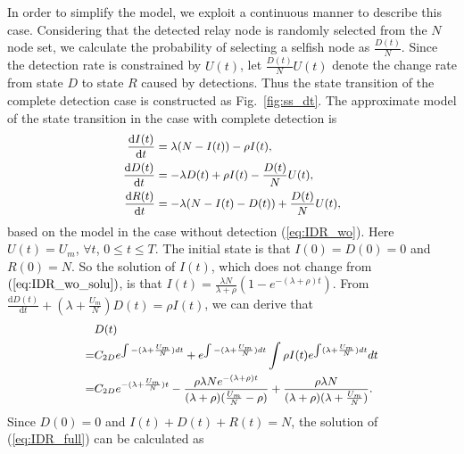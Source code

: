 In order to simplify the model,
we exploit a continuous manner to
describe this case.
Considering that the detected relay node
is randomly selected from the $N$ node set,
we calculate the probability of selecting a selfish node
as $\frac{D(t)}{N}$.
Since the detection rate is constrained by $U(t)$,
let $\frac{D(t)}{N}U(t)$ denote
the change rate from state $D$ to state $R$ caused by detections.
Thus the state transition of the complete detection case
is constructed as Fig.~\ref{fig:ss_dt}.
The approximate model of the state transition
in the case with complete detection
is
\begin{equation}
\begin{small}
\label{eq:IDR_full}
\begin{aligned}
\frac{\mathrm{d} I(t)}{\mathrm{d} t} &=  \lambda (N-I(t)) - \rho I(t),\\
\frac{\mathrm{d} D(t)}{\mathrm{d} t} &= - \lambda D(t) + \rho I(t) - \frac{D(t)}{N} U(t),\\
\frac{\mathrm{d} R(t)}{\mathrm{d} t} &= - \lambda (N-I(t)-D(t)) + \frac{D(t)}{N} U(t),
\end{aligned}
\end{small}
\end{equation}
based on the model in the case without detection (\ref{eq:IDR_wo}).
Here $U(t) = U_{m}$, $\forall t$, $0 \le t \le T$.
The initial state is that $I(0)=D(0)=0$ and $R(0)=N$.
So the solution of $I(t)$, which does not change from $(\ref{eq:IDR_wo_solu})$,
is that $I(t) = \frac{ \lambda N }{ \lambda + \rho }(1- e^{-(\lambda + \rho)t})$.
From $\frac{\mathrm{d} D(t)}{\mathrm{d} t} + (\lambda + \frac{U_{m}}{N}) D(t)= \rho I(t)$,
we can derive that
\begin{equation}
\begin{small}
\nonumber
\begin{aligned}
& D(t) \\
=& C_{2D} e^{\int -(\lambda + \frac{U_{m}}{N}) dt}
+ e^{\int -(\lambda + \frac{U_{m}}{N}) dt}
\int \rho I(t) e^{\int (\lambda + \frac{U_{m}}{N}) dt} dt \\
=& C_{2D} e^{-(\lambda + \frac{U_{m}}{N})t}
- \frac{ \rho \lambda N e^{-(\lambda + \rho)t}}
{ (\lambda + \rho)(\frac{U_{m}}{N} - \rho) } 
+ \frac{ \rho \lambda N }
{ (\lambda + \rho)(\lambda + \frac{U_{m}}{N}) }.
\end{aligned}
\end{small}
\end{equation}
Since $D(0) = 0$ and $I(t) + D(t) + R(t) = N$,
the solution of (\ref{eq:IDR_full}) can be calculated as
